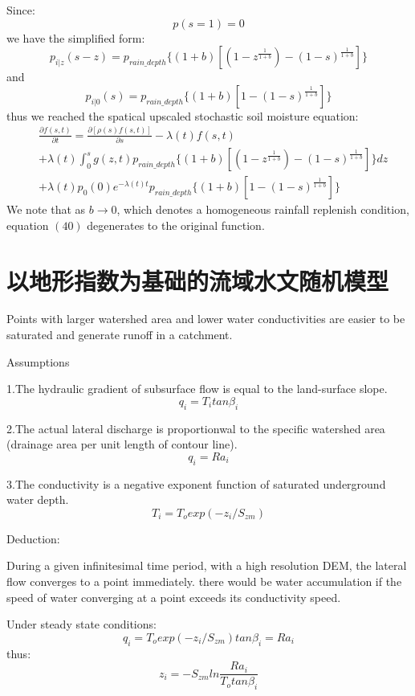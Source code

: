 Since:
\begin{equation}
p(s=1)=0
\end{equation}
we have the simplified form:
\begin{equation}
p_{i|z}(s-z)=p_{rain\_depth} \lbrace(1+b)[(1-z^{\frac{1}{1+b}})-(1-s)^{\frac{1}{1+b}}]\rbrace
\end{equation}
and
\begin{equation}
p_{i|0}(s)=p_{rain\_depth} \lbrace(1+b)[1-(1-s)^{\frac{1}{1+b}}]\rbrace
\end{equation}
thus we reached the spatical upscaled stochastic soil moisture equation:
 \begin{equation}
 \begin{split}
 &\frac{\partial{f(s,t)}}{\partial t}=\frac{\partial{[\rho(s)f(s,t)]}}{\partial s}-\lambda(t)f(s,t)\\&+\lambda(t)\int_{0}^{s} g(z,t)p_{rain\_depth} \lbrace(1+b)[(1-z^{\frac{1}{1+b}})-(1-s)^{\frac{1}{1+b}}]\rbrace dz\\&+\lambda(t)p_0(0)e^{-\lambda(t) t}p_{rain\_depth} \lbrace(1+b)[1-(1-s)^{\frac{1}{1+b}}]\rbrace
 \end{split}
 \end{equation}
We note that as $b\rightarrow0$, which denotes a homogeneous rainfall replenish condition, equation $(40)$ degenerates to the original function.
\section{以地形指数为基础的流域水文随机模型}
Points with larger watershed area and lower water conductivities are easier to be saturated and generate runoff in a catchment.

Assumptions

1.The hydraulic gradient of subsurface flow is equal to the land-surface slope.
\begin{equation}
q_i=T_itan\beta_i
\end{equation}

2.The actual lateral discharge is proportionwal to the specific watershed area (drainage area per unit length of
contour line).
\begin{equation}
q_i=Ra_i
\end{equation}

3.The conductivity is a negative exponent function of saturated underground water depth.
\begin{equation}
T_i=T_oexp(-z_i/S_{zm})
\end{equation}

Deduction:

During a given infinitesimal time period, with a high resolution DEM, the lateral flow converges to a point immediately. 
there would be water accumulation if the speed of water converging at a point exceeds its conductivity speed.

Under steady state conditions:
\begin{equation}
q_i=T_oexp(-z_i/S_{zm})tan\beta_i=Ra_i
\end{equation}
thus:
\begin{equation}
z_i=-S_{zm}ln\frac{Ra_i}{T_otan\beta_i}
\end{equation}
 
